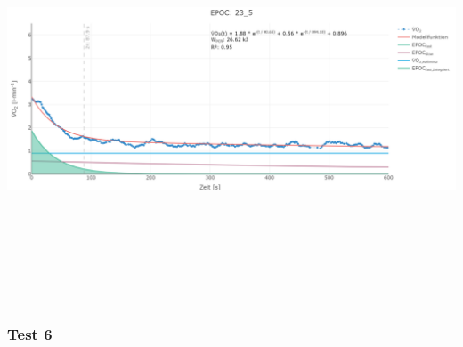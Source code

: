 \documentclass[
  letterpaper,
  DIV=11]{scrartcl}
\begin{document}
\includegraphics[width=11.45833in,height=4.6875in]{images/23_5.png}

\subsubsection{Test 6}
\end{document}
